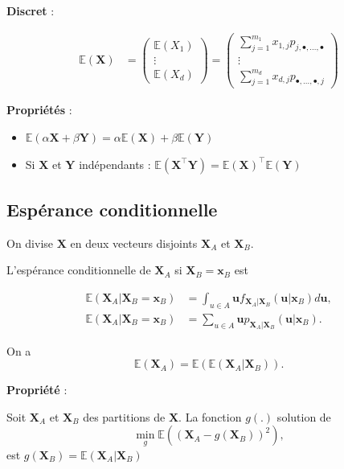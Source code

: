 \documentclass[12pt,a4paper]{article}
\begin{document}
\textbf{Discret} :

\begin{align*}
\mathbb{E}(\mathbf{X}) &= \begin{pmatrix} 
\mathbb{E}(X_1) \\ 
\vdots \\ 
\mathbb{E}(X_d) 
\end{pmatrix} 
= \begin{pmatrix} 
\sum_{j=1}^{m_1} x_{1,j} p_{j, \bullet, \dots, \bullet} \\ 
\vdots \\ 
\sum_{j=1}^{m_d} x_{d,j} p_{\bullet, \dots, \bullet, j} 
\end{pmatrix}
\end{align*}

\textbf{Propriétés} :

\begin{itemize}
    \item $\mathbb{E}(\alpha \mathbf{X} + \beta \mathbf{Y}) = \alpha \mathbb{E}(\mathbf{X}) + \beta \mathbb{E}(\mathbf{Y})$
    \item Si $\mathbf{X}$ et $\mathbf{Y}$ indépendants : $\mathbb{E}(\mathbf{X}^\top \mathbf{Y}) = \mathbb{E}(\mathbf{X})^\top \mathbb{E}(\mathbf{Y})$
\end{itemize}


\subsection{Espérance conditionnelle}

On divise $\mathbf{X}$ en deux vecteurs disjoints $\mathbf{X}_A$ et $\mathbf{X}_B$.

L'espérance conditionnelle de $\mathbf{X}_A$ si $\mathbf{X}_B = \mathbf{x}_B$ est

\begin{align*}
    \mathbb{E}(\mathbf{X}_A | \mathbf{X}_B = \mathbf{x}_B) &= \int_{u \in A} \mathbf{u} f_{\mathbf{X}_A | \mathbf{X}_B} (\mathbf{u} | \mathbf{x}_B) d\mathbf{u}, \\
    \mathbb{E}(\mathbf{X}_A | \mathbf{X}_B = \mathbf{x}_B) &= \sum_{u \in A} \mathbf{u} p_{\mathbf{X}_A | \mathbf{X}_B} (\mathbf{u} | \mathbf{x}_B).
\end{align*}

On a
$$\mathbb{E}(\mathbf{X}_A) = \mathbb{E}(\mathbb{E}(\mathbf{X}_A | \mathbf{X}_B)).$$

\medskip

\textbf{Propriété} :

Soit $\mathbf{X}_A$ et $\mathbf{X}_B$ des partitions de $\mathbf{X}$. La fonction $g(.)$ solution de
$$\min_g \mathbb{E} \left( \left( \mathbf{X}_A - g(\mathbf{X}_B) \right)^2 \right),$$
est $g(\mathbf{X}_B) = \mathbb{E}(\mathbf{X}_A|\mathbf{X}_B)$
\end{document}
